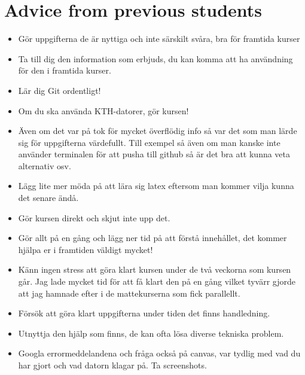 \section{Advice from previous students}

\begin{frame}
  \begin{example}
    \begin{itemize}
      \item Gör uppgifterna de är nyttiga och inte särskilt svåra, bra för 
        framtida kurser
      \item Ta till dig den information som erbjuds, du kan komma att ha 
        användning för den i framtida kurser.
      \item Lär dig Git ordentligt!
      \item Om du ska använda KTH-datorer, gör kursen!
      \item Även om det var på tok för mycket överflödig info så var det som 
        man lärde sig för uppgifterna värdefullt. Till exempel så även om man 
        kanske inte använder terminalen för att pusha till github så är det bra 
        att kunna veta alternativ osv.
      \item Lägg lite mer möda på att lära sig latex eftersom man kommer vilja 
        kunna det senare ändå.
    \end{itemize}
  \end{example}
\end{frame}

\begin{frame}
  \begin{example}
    \begin{itemize}
      \item Gör kursen direkt och skjut inte upp det.
      \item Gör allt på en gång och lägg ner tid på att förstå innehållet, det 
        kommer hjälpa er i framtiden väldigt mycket!
      \item Känn ingen stress att göra klart kursen under de två veckorna som 
        kursen går. Jag lade mycket tid för att få klart den på en gång vilket 
        tyvärr gjorde att jag hamnade efter i de mattekurserna som fick parallellt.
    \end{itemize}
  \end{example}
\end{frame}

\begin{frame}
  \begin{example}[Help?]
    \begin{itemize}
      \item Försök att göra klart uppgifterna under tiden det finns 
        handledning.
      \item Utnyttja den hjälp som finns, de kan ofta lösa diverse tekniska 
        problem.
      \item Googla errormeddelandena och fråga också på canvas, var tydlig med 
        vad du har gjort och vad datorn klagar på. Ta screenshots.
    \end{itemize}
  \end{example}
\end{frame}

